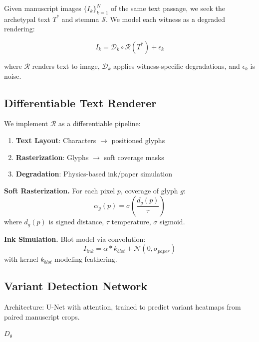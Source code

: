 \documentclass[12pt,a4paper]{article}
\begin{document}
Given manuscript images $\{I_k\}_{k=1}^N$ of the same text passage,
we seek the archetypal text $T^*$ and stemma $\mathcal{S}$.
We model each witness as a degraded rendering:

\begin{equation}\label{eq:degradation}
I_k = \mathcal{D}_k \circ \mathcal{R}(T^*) + \epsilon_k
\end{equation}

where $\mathcal{R}$ renders text to image, $\mathcal{D}_k$ applies
witness-specific degradations, and $\epsilon_k$ is noise.

\subsection{Differentiable Text Renderer}
\label{sec:renderer}

We implement $\mathcal{R}$ as a differentiable pipeline:

\begin{enumerate}
    \item \textbf{Text Layout}: Characters $\to$ positioned glyphs
    \item \textbf{Rasterization}: Glyphs $\to$ soft coverage masks
    \item \textbf{Degradation}: Physics-based ink/paper simulation
\end{enumerate}

\textbf{Soft Rasterization.} For each pixel $p$, coverage of glyph $g$:
\begin{equation}
\alpha_g(p) = \sigma\left( \frac{d_g(p)}{\tau} \right)
\end{equation}
where $d_g(p)$ is signed distance, $\tau$ temperature, $\sigma$ sigmoid.

\textbf{Ink Simulation.} Blot model via convolution:
\begin{equation}
I_{ink} = \alpha * k_{blot} + \mathcal{N}(0, \sigma_{paper})
\end{equation}
with kernel $k_{blot}$ modeling feathering.

\subsection{Variant Detection Network}
\label{sec:variant-net}

Architecture: U-Net with attention, trained to predict
variant heatmaps from paired manuscript crops.

\begin{algorithm}[htbp]
\caption{Variant Detection Training}\label{alg:variant}
\Return $D_\theta$
\end{algorithm}
\end{document}
